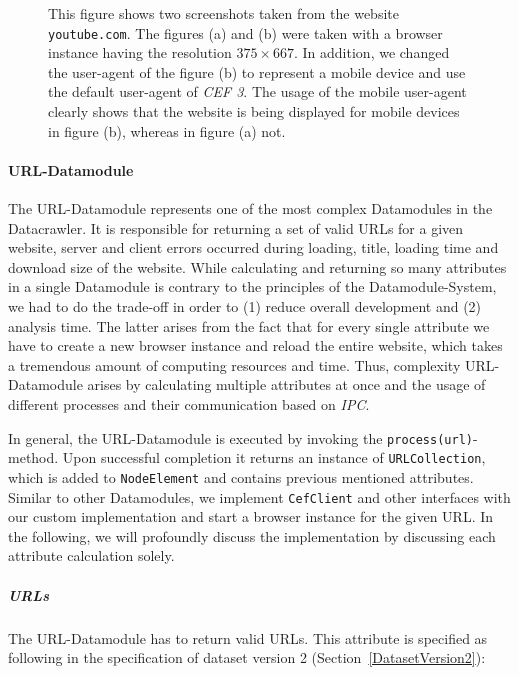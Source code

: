\begin{figure}
\begin{subfigure}{0.6\textwidth}
		\caption{}
		\label{compare_useragent}
	\end{subfigure}
	\caption[Mobile and Desktop Screenshot taken by the Datacrawler]{This figure shows two screenshots taken from the website \texttt{youtube.com}. The figures (a) and (b) were taken with a browser instance having the resolution $375 \times 667$. In addition, we changed the user-agent of the figure (b) to represent a mobile device and use the default user-agent of \textit{CEF 3}. The usage of the mobile user-agent clearly shows that the website is being displayed for mobile devices in figure (b), whereas in figure (a) not.}
	\label{compare_resolution_useragent}
\end{figure}

\paragraph*{URL-Datamodule}
\label{datacrawler_url_datamodule}
The URL-Datamodule represents one of the most complex Datamodules in the Datacrawler. It is responsible for returning a set of valid URLs for a given website, server and client errors occurred during loading, title, loading time and download size of the website. While calculating and returning so many attributes in a single Datamodule is contrary to the principles of the Datamodule-System, we had to do the trade-off in order to (1) reduce overall development and (2) analysis time. The latter arises from the fact that for every single attribute we have to create a new browser instance and reload the entire website, which takes a tremendous amount of computing resources and time. Thus, complexity URL-Datamodule arises by calculating multiple attributes at once and the usage of different processes and their communication based on \textit{IPC}.

In general, the URL-Datamodule is executed by invoking the \texttt{process(url)}-method. Upon successful completion it returns an instance of \texttt{URLCollection}, which is added to \texttt{NodeElement} and contains previous mentioned attributes. Similar to other Datamodules, we implement \texttt{CefClient} and other interfaces with our custom implementation and start a browser instance for the given URL. In the following, we will profoundly discuss the implementation by discussing each attribute calculation solely.

\subparagraph*{URLs}
The URL-Datamodule has to return valid URLs. This attribute is specified as following in the specification of dataset version 2 (Section~\ref{DatasetVersion2}):

